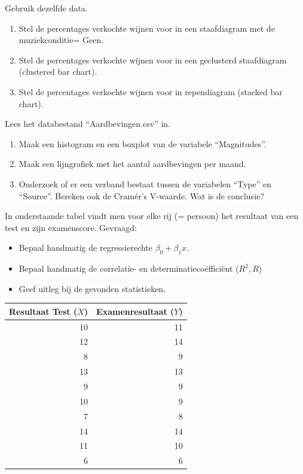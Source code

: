 \begin{exercise}
	Gebruik dezelfde data.
		\begin{enumerate}
		\item Stel de percentages verkochte wijnen voor in een staafdiagram met de  muziekconditie= Geen.
		\item Stel de percentages verkochte wijnen voor in een geclusterd staafdiagram (clustered bar chart).
		\item Stel de percentages verkochte wijnen voor in rependiagram (stacked bar chart).
	\end{enumerate}
\end{exercise}

\begin{exercise}
	\label{oef:Kruistabellen, Cramér's V en chi-kwadraat met R } %
Lees het databestand ``Aardbevingen.csv'' in. 	
		\begin{enumerate}
		\item Maak een histogram en een boxplot van de variabele ``Magnitudes''.
		\item Maak een lijngrafiek met het aantal aardbevingen per maand.
		\item Onderzoek of er een verband bestaat tussen de variabelen ``Type'' en ``Source''. Bereken ook de Cramér's V-waarde. Wat is de conclusie?
	\end{enumerate}
\end{exercise}

\begin{exercise}
	\label{oef:Lineaire regressie, correlatie en determinatiecoëfficiënt - handmatig}
	In onderstaande tabel vindt men voor elke rij (= persoon) het resultaat van een test en zijn examenscore. Gevraagd:
\begin{itemize}
	\item Bepaal handmatig de regressierechte $\beta_{0} + \beta_{1} x$. 
	\item Bepaal handmatig de correlatie- en determinatieco\"effici\"ent ($R^{2}, R$) 
	\item Geef uitleg bij de gevonden statistieken.
\end{itemize}

	\centering
	\begin{tabular}{@{}rr@{}} \toprule
	Resultaat Test ($X$) & Examenresultaat ($Y$) \\
		\midrule
		10 & 11 \\
		12 & 14 \\
		8 & 9 \\
		13 & 13 \\
		9 & 9 \\
		10 &  9 \\
		7 & 8 \\
		14 & 14 \\
		11 & 10 \\
		6 & 6  \\
		\bottomrule
	\end{tabular}
	\label{tab:testExamen}
\end{exercise}


